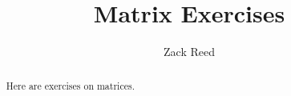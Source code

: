 \documentclass{xourse}
\author{Zack Reed}
\title{Matrix Exercises}
\begin{document}
\begin{abstract}
Here are exercises on matrices.
\end{abstract}
\maketitle










\end{document}
